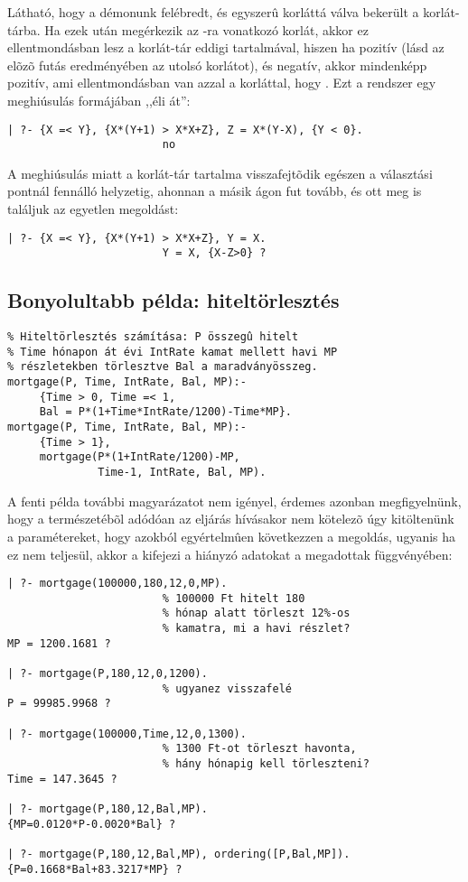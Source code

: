 Látható, hogy a démonunk felébredt, és egyszerû korláttá válva bekerült a
korlát-tárba. Ha ezek után megérkezik az -ra vonatkozó korlát, akkor
ez ellentmondásban lesz a korlát-tár eddigi tartalmával, hiszen ha 
pozitív (lásd az elõzõ futás eredményében az utolsó korlátot), és 
negatív, akkor  mindenképp pozitív, ami ellentmondásban van azzal
a korláttal, hogy . Ezt a rendszer egy meghiúsulás formájában
,,éli át'':

\begin{verbatim}
| ?- {X =< Y}, {X*(Y+1) > X*X+Z}, Z = X*(Y-X), {Y < 0}.
                        no
\end{verbatim}

A meghiúsulás miatt a korlát-tár tartalma visszafejtõdik egészen a választási
pontnál fennálló helyzetig, ahonnan a másik ágon fut tovább, és ott meg is
találjuk az egyetlen megoldást:

\begin{verbatim}
| ?- {X =< Y}, {X*(Y+1) > X*X+Z}, Y = X.
                        Y = X, {X-Z>0} ? 
\end{verbatim}

\subsection{Bonyolultabb \clpq példa: hiteltörlesztés}

\begin{verbatim}
% Hiteltörlesztés számítása: P összegû hitelt
% Time hónapon át évi IntRate kamat mellett havi MP
% részletekben törlesztve Bal a maradványösszeg.
mortgage(P, Time, IntRate, Bal, MP):-
     {Time > 0, Time =< 1,
     Bal = P*(1+Time*IntRate/1200)-Time*MP}.
mortgage(P, Time, IntRate, Bal, MP):-
     {Time > 1},
     mortgage(P*(1+IntRate/1200)-MP, 
              Time-1, IntRate, Bal, MP).
\end{verbatim}

A fenti \clpq példa további magyarázatot nem igényel, érdemes azonban
megfigyelnünk, hogy a \clpq természetébõl adódóan az eljárás hívásakor
nem kötelezõ úgy kitöltenünk a paramétereket, hogy azokból egyértelmûen
következzen a megoldás, ugyanis ha ez nem teljesül, akkor a \clpq
kifejezi a hiányzó adatokat a megadottak függvényében:

\begin{verbatim}
| ?- mortgage(100000,180,12,0,MP).
                        % 100000 Ft hitelt 180        
                        % hónap alatt törleszt 12%-os 
                        % kamatra, mi a havi részlet?                 
MP = 1200.1681 ? 

| ?- mortgage(P,180,12,0,1200).         
                        % ugyanez visszafelé
P = 99985.9968 ? 

| ?- mortgage(100000,Time,12,0,1300).   
                        % 1300 Ft-ot törleszt havonta,
                        % hány hónapig kell törleszteni?                      
Time = 147.3645 ? 

| ?- mortgage(P,180,12,Bal,MP). 
{MP=0.0120*P-0.0020*Bal} ? 

| ?- mortgage(P,180,12,Bal,MP), ordering([P,Bal,MP]).
{P=0.1668*Bal+83.3217*MP} ? 
\end{verbatim}

